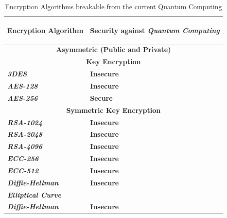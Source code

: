 \documentclass[conference]{IEEEtran}
\begin{document}
\begin{table}[!hp]
\centering
    \caption{Encryption Algorithms breakable from the current Quantum Computing}
    \begin{tabular}{ |p{3cm}|p{3cm}| }
     \hline
     \begin{center}\textbf{Encryption Algorithm}\end{center} & \begin{center}\textbf{Security against \textit{Quantum Computing}}\end{center}\\
     \hline
     \hline
     \multicolumn{2}{|c|}{\textbf{Asymmetric (Public and Private)}} \\
     \multicolumn{2}{|c|}{\textbf{Key Encryption}} \\
     \hline
     \hline
     \textit{\textbf{3DES}} & \textbf{Insecure} \\
     \hline
     \textit{\textbf{AES-128}} & \textbf{Insecure} \\
     \hline
     \textit{\textbf{AES-256}} & \textbf{Secure} \\
     \hline
     \hline
     \multicolumn{2}{|c|}{\textbf{Symmetric Key Encryption}} \\
     \hline
     \hline
     \textit{\textbf{RSA-1024}} & \textbf{Insecure} \\
     \hline
     \textit{\textbf{RSA-2048}} & \textbf{Insecure} \\
     \hline
     \textit{\textbf{RSA-4096}} & \textbf{Insecure} \\
     \hline
     \textit{\textbf{ECC-256}} & \textbf{Insecure} \\
     \hline
     \textit{\textbf{ECC-512}} & \textbf{Insecure} \\
     \hline
     \textit{\textbf{Diffie-Hellman}} & \textbf{Insecure} \\
     \hline
     \textit{\textbf{Elliptical Curve}} & \\\textit{\textbf{Diffie-Hellman}} & \textbf{Insecure} \\
     \hline
    \end{tabular}
\end{table}

\vspace{1pt}



\vspace{4pt}

\newpage
\end{document}
